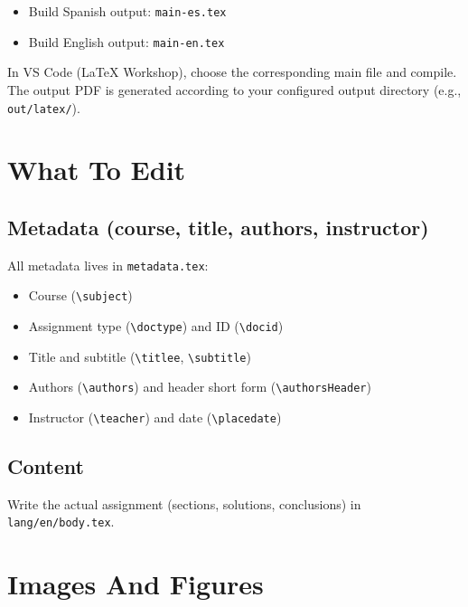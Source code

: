 \begin{itemize}
  \item Build Spanish output: \texttt{main-es.tex}
  \item Build English output: \texttt{main-en.tex}
\end{itemize}

\vspace{2mm}

In VS Code (LaTeX Workshop), choose the corresponding main file and compile. The output PDF is generated according to your configured output directory (e.g., \texttt{out/latex/}).


\section{What To Edit}
\vspace{2mm}

\subsection{Metadata (course, title, authors, instructor)}
\vspace{2mm}

All metadata lives in \texttt{metadata.tex}:
\begin{itemize}
  \item Course (\texttt{\textbackslash subject})
  \item Assignment type (\texttt{\textbackslash doctype}) and ID (\texttt{\textbackslash docid})
  \item Title and subtitle (\texttt{\textbackslash titlee}, \texttt{\textbackslash subtitle})
  \item Authors (\texttt{\textbackslash authors}) and header short form (\texttt{\textbackslash authorsHeader})
  \item Instructor (\texttt{\textbackslash teacher}) and date (\texttt{\textbackslash placedate})
\end{itemize}

\vspace{2mm}

\subsection{Content}
\vspace{2mm}

Write the actual assignment (sections, solutions, conclusions) in \texttt{lang/en/body.tex}.


\section{Images And Figures}
\vspace{2mm}

